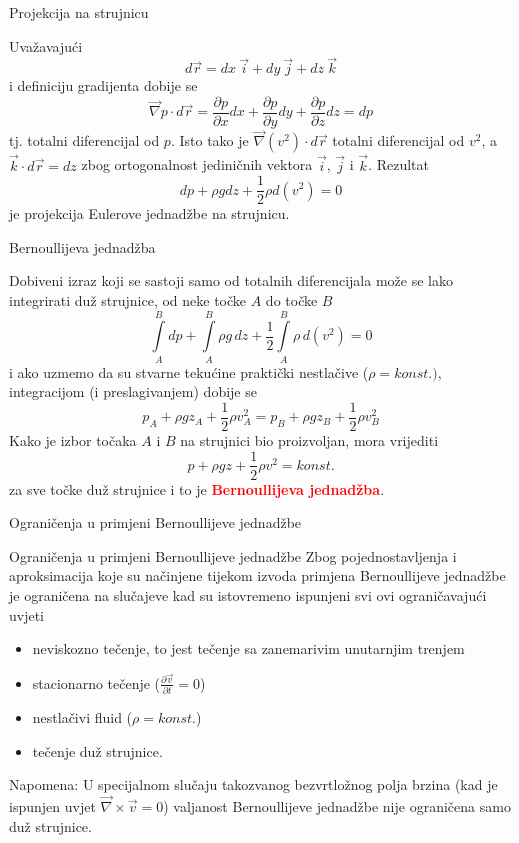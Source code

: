 \documentclass[croatian]{beamer}
\begin{document}
\begin{frame}{Projekcija na strujnicu}

Uvažavajući 
\[
d\vec{r}=dx\:\vec{i}+dy\:\vec{j}+dz\:\vec{k}
\]
i definiciju gradijenta dobije se 
\[
\vec{\nabla}p\cdot d\vec{r}=\frac{\partial p}{\partial x}dx+\frac{\partial p}{\partial y}dy+\frac{\partial p}{\partial z}dz=dp
\]
tj. totalni diferencijal od $p$. Isto tako je $\vec{\nabla}(v^{2})\cdot d\vec{r}$
totalni diferencijal od $v^{2}$, a $\vec{k}\cdot d\vec{r}=dz$ zbog
ortogonalnost jediničnih vektora $\vec{i}$, $\vec{j}$ i $\vec{k}$.
Rezultat 
\[
dp+\rho gdz+\frac{1}{2}\rho d(v^{2})=0
\]
je projekcija Eulerove jednadžbe na strujnicu.
\end{frame}

\begin{frame}{Bernoullijeva jednadžba}

Dobiveni izraz koji se sastoji samo od totalnih diferencijala može
se lako integrirati duž strujnice, od neke točke $A$ do točke $B$
\[
\int\limits _{A}^{B}dp+\int\limits _{A}^{B}\rho g\,dz+\frac{1}{2}\int\limits _{A}^{B}\rho\,d(v^{2})=0
\]
i ako uzmemo da su stvarne tekućine praktički nestlačive ($\rho=konst.)$,
integracijom (i preslagivanjem) dobije se 
\[
p_{{\scriptscriptstyle A}}+\rho gz_{{\scriptscriptstyle A}}+\frac{1}{2}\rho v_{{\scriptscriptstyle A}}^{2}=p_{{\scriptscriptstyle B}}+\rho gz_{{\scriptscriptstyle B}}+\frac{1}{2}\rho v_{{\scriptscriptstyle B}}^{2}
\]
Kako je izbor točaka $A$ i $B$ na strujnici bio proizvoljan, mora
vrijediti 
\[
p+\rho gz+\frac{1}{2}\rho v^{2}=konst.
\]
za sve točke duž strujnice i to je \textbf{\textcolor{red}{Bernoullijeva
jednadžba}}.
\end{frame}

\begin{frame}{Ograničenja u primjeni Bernoullijeve jednadžbe}

\begin{alertblock}{Ograničenja u primjeni Bernoullijeve jednadžbe}
Zbog pojednostavljenja i aproksimacija koje su načinjene tijekom
izvoda primjena Bernoullijeve jednadžbe je ograničena na slučajeve
kad su istovremeno ispunjeni svi ovi ograničavajući uvjeti 

\begin{itemize}
\item neviskozno tečenje, to jest tečenje sa zanemarivim unutarnjim trenjem 
\item stacionarno tečenje ($\frac{\partial\vec{v}}{\partial t}=0$) 
\item nestlačivi fluid ($\rho=konst.$) 
\item tečenje duž strujnice. 
\end{itemize}

\end{alertblock}
Napomena: U specijalnom slučaju takozvanog bezvrtložnog polja brzina
(kad je ispunjen uvjet $\vec{\nabla}\times\vec{v}=0$) valjanost Bernoullijeve
jednadžbe nije ograničena samo duž strujnice.
\end{frame}
\end{document}
